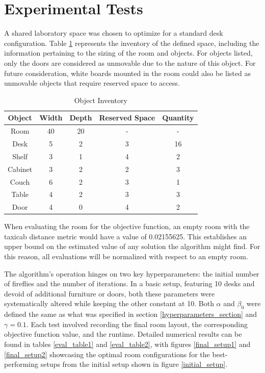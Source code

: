 \documentclass[sigconf,authordraft]{acmart}
\begin{document}
\section{Experimental Tests}
A shared laboratory space was chosen to optimize for a standard desk configuration. Table \ref{object_table} represents the inventory of the defined space, including the information pertaining to the sizing of the room and objects. For objects listed, only the doors are considered as unmovable due to the nature of this object. For future consideration, white boards mounted in the room could also be listed as unmovable objects that require reserved space to access.

\begin{table}[!h]
    \centering
    \caption{Object Inventory}
    \label{object_table}
    \begin{tabular}{|c|c|c|c|c|}
        \hline
        \textbf{Object} & \textbf{Width} & \textbf{Depth} & \textbf{Reserved Space} & \textbf{Quantity} \\
        \hline
        Room & 40 & 20 & - & - \\
        Desk & 5 & 2 & 3 & 16 \\
        Shelf & 3 & 1 & 4 & 2 \\
        Cabinet & 3 & 2 & 2 & 3 \\
        Couch & 6 & 2 & 3 & 1 \\
        Table & 4 & 2 & 3 & 3 \\
        Door & 4 & 0 & 4 & 2 \\
        \hline
    \end{tabular}
\end{table}

When evaluating the room for the objective function, an empty room with the taxicab distance metric would have a value of 0.02155625. This establishes an upper bound on the estimated value of any solution the algorithm might find. For this reason, all evaluations will be normalized with respect to an empty room.

The algorithm's operation hinges on two key hyperparameters: the initial number of fireflies and the number of iterations. In a basic setup, featuring 10 desks and devoid of additional furniture or doors, both these parameters were systematically altered while keeping the other constant at 10. Both $\alpha$ and $\beta_0$ were defined the same as what was specified in section \ref{hyperparameters_section} and $\gamma = 0.1$. Each test involved recording the final room layout, the corresponding objective function value, and the runtime. Detailed numerical results can be found in tables \ref{eval_table1} and \ref{eval_table2}, with figures \ref{final_setup1} and \ref{final_setup2} showcasing the optimal room configurations for the best-performing setups from the initial setup shown in figure \ref{initial_setup}.
\end{document}
